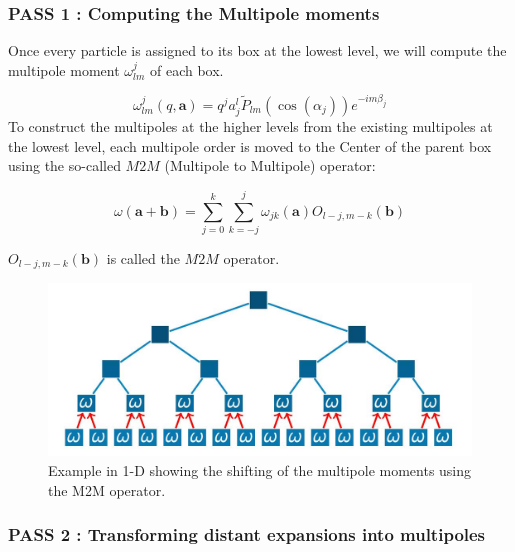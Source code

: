 \documentclass[12pt,twoside,a4paper]{report}
\begin{document}
	
	    
    
    
    \subsubsection{PASS 1 : Computing the Multipole moments}
    
    Once every particle is assigned to its box at the lowest level, we will compute the multipole moment $\omega_{lm}^j$ of each box.
    
    \begin{equation}
    \omega_{lm}^{j}(q,\textbf{a}) = q^j a_j^l \widetilde{P}_{lm}(\cos(\alpha_j))e^{-im\beta_j}
    \end{equation}
%
To construct the multipoles at the higher levels from the existing multipoles at the lowest level, each multipole order is moved to the Center of the parent box using the so-called $M2M$ (Multipole to Multipole) operator:    
    
    \begin{equation}
    \omega(\textbf{a} + \textbf{b}) = \sum\limits_{j=0}^{k} \sum\limits_{k=-j}^{j} \omega_{jk}(\textbf{a}) O_{l-j,m-k}(\textbf{b})
    \end{equation}

   $O_{l-j,m-k}(\textbf{b})$ is called the $M2M$ operator.
   
   \begin{figure}[H]
   \includegraphics[scale=0.4]{ShiftMultipole}
    \centering 
    \caption{Example in 1-D showing the shifting of the multipole moments using the M2M operator. }
    \label{fig:multipole}
   \end{figure}
   
   
   	\subsubsection{PASS 2 : Transforming distant expansions into multipoles}
   	
\end{document}
